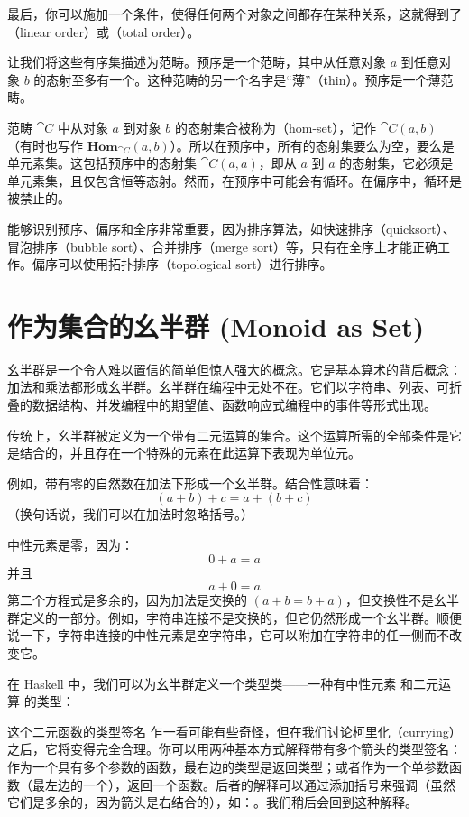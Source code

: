 最后，你可以施加一个条件，使得任何两个对象之间都存在某种关系，这就得到了（linear order）或（total order）。

让我们将这些有序集描述为范畴。预序是一个范畴，其中从任意对象 $a$ 到任意对象 $b$ 的态射至多有一个。这种范畴的另一个名字是“薄”（thin）。预序是一个薄范畴。

范畴 $\cat{C}$ 中从对象 $a$ 到对象 $b$ 的态射集合被称为（hom-set），记作 $\cat{C}(a, b)$（有时也写作 $\mathbf{Hom}_{\cat{C}}(a, b)$）。所以在预序中，所有的态射集要么为空，要么是单元素集。这包括预序中的态射集 $\cat{C}(a, a)$，即从 $a$ 到 $a$ 的态射集，它必须是单元素集，且仅包含恒等态射。然而，在预序中可能会有循环。在偏序中，循环是被禁止的。

能够识别预序、偏序和全序非常重要，因为排序算法，如快速排序（quicksort）、冒泡排序（bubble sort）、合并排序（merge sort）等，只有在全序上才能正确工作。偏序可以使用拓扑排序（topological sort）进行排序。

\section{作为集合的幺半群 (Monoid as Set)}

幺半群是一个令人难以置信的简单但惊人强大的概念。它是基本算术的背后概念：加法和乘法都形成幺半群。幺半群在编程中无处不在。它们以字符串、列表、可折叠的数据结构、并发编程中的期望值、函数响应式编程中的事件等形式出现。

传统上，幺半群被定义为一个带有二元运算的集合。这个运算所需的全部条件是它是结合的，并且存在一个特殊的元素在此运算下表现为单位元。

例如，带有零的自然数在加法下形成一个幺半群。结合性意味着：
\[(a + b) + c = a + (b + c)\]
（换句话说，我们可以在加法时忽略括号。）

中性元素是零，因为：
\[0 + a = a\]
并且
\[a + 0 = a\]
第二个方程式是多余的，因为加法是交换的 $(a + b = b + a)$，但交换性不是幺半群定义的一部分。例如，字符串连接不是交换的，但它仍然形成一个幺半群。顺便说一下，字符串连接的中性元素是空字符串，它可以附加在字符串的任一侧而不改变它。

在 Haskell 中，我们可以为幺半群定义一个类型类——一种有中性元素  和二元运算  的类型：

这个二元函数的类型签名  乍一看可能有些奇怪，但在我们讨论柯里化（currying）之后，它将变得完全合理。你可以用两种基本方式解释带有多个箭头的类型签名：作为一个具有多个参数的函数，最右边的类型是返回类型；或者作为一个单参数函数（最左边的一个），返回一个函数。后者的解释可以通过添加括号来强调（虽然它们是多余的，因为箭头是右结合的），如：。我们稍后会回到这种解释。

